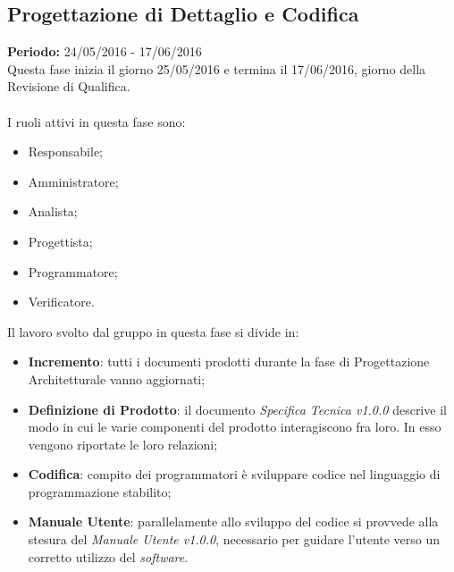 \subsection{Progettazione di Dettaglio e Codifica}
\textbf{Periodo:} 24/05/2016 - 17/06/2016\\
Questa fase inizia il giorno 25/05/2016 e termina il 17/06/2016, giorno della 
Revisione di Qualifica. \\\\
I ruoli attivi in questa fase sono:

\begin{itemize}
	\item Responsabile;
	\item Amministratore;
	\item Analista;
	\item Progettista;
	\item Programmatore;
	\item Verificatore.
\end{itemize}
Il lavoro svolto dal gruppo in questa fase si divide in:
\begin{itemize}
	\item \textbf{Incremento}: tutti i documenti prodotti durante la fase di 
	Progettazione Architetturale vanno aggiornati;
	\item \textbf{Definizione di Prodotto}: il documento \textit{Specifica 
	Tecnica v1.0.0} descrive il modo in cui le varie componenti 
	del prodotto interagiscono fra loro. In esso vengono riportate le loro relazioni;
	\item \textbf{Codifica}: compito dei programmatori è sviluppare codice nel 
	linguaggio di programmazione stabilito;
	\item \textbf{Manuale Utente}: parallelamente allo sviluppo del codice si 
	provvede alla stesura del \textit{Manuale Utente v1.0.0}, necessario per guidare 
	l'utente verso un corretto utilizzo del \textit{software}.
\end{itemize}

